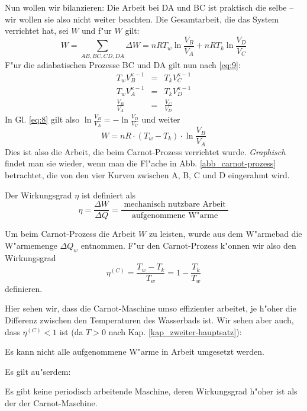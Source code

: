 \bigskip
\noindent
Nun wollen wir bilanzieren: Die Arbeit bei DA und BC ist praktisch die
selbe -- wir wollen sie also nicht weiter beachten. Die Gesamtarbeit,
die das System verrichtet hat, sei $W$ und f"ur $W$ gilt:
\begin{equation}
   \label{eq:8}
   W = \sum_{AB,BC,CD,DA} \Delta W = nRT_w \ln\frac{V_B}{V_A} + nRT_k \ln
\frac{V_D}{V_C}
\end{equation}
F"ur die adiabatischen Prozesse BC und DA gilt nun nach \eqref{eq:9}:
\begin{eqnarray}
\nonumber
   T_wV_B^{ \kappa-1 } &=& T_k V_C^{ \kappa-1 }\\
\nonumber
   T_wV_A^{ \kappa-1 } &=& T_k V_D^{ \kappa-1 }\\
\label{eq:11}
\frac{V_B}{V_A} &=& \frac{V_C}{V_D}
\end{eqnarray}
In Gl. \eqref{eq:8} gilt also $\ln\frac{V_B}{V_A} = -\ln
\frac{V_D}{V_C}$ und weiter
\begin{equation}
   \label{eq:12}
\boxed{ W =  nR\cdot(T_w - T_k)\cdot \ln \frac{V_B}{V_A} }
\end{equation}
Dies ist also die Arbeit, die beim Carnot-Prozess verrichtet
wurde. \emph{Graphisch} findet man sie wieder, wenn man die Fl"ache in
Abb. \ref{abb_carnot-prozess} betrachtet, die von den vier Kurven
zwischen A, B, C und D eingerahmt wird.






\begin{Def}
Der Wirkungsgrad $\eta$ ist definiert als
\begin{equation}
   \label{eqn_def_wirkungsgrad}
\eta = \frac{\Delta W}{ \Delta Q}    = \frac{\text{ mechanisch
    nutzbare Arbeit }}{\text{ aufgenommene W"arme }}
\end{equation}
\end{Def}

Um beim Carnot-Prozess die Arbeit $W$ zu leisten, wurde aus dem
W"armebad die W"armemenge $\Delta Q_w$ entnommen. F"ur den Carnot-Prozess
k"onnen wir also den Wirkungsgrad
\begin{equation}
   \label{eqn_carnot_wirkungsgrad}
\eta^{ (C) } = \frac{T_w - T_k}{T_w}    = 1- \frac{T_k}{T_w}
\end{equation}
definieren.

Hier sehen wir, dass die Carnot-Maschine umso effizienter arbeitet,
je h"oher die Differenz zwischen den Temperaturen des Wasserbads ist.
Wir sehen aber auch, dass $\eta^{ (C) } < 1$ ist (da $T>0$ nach Kap.
\ref{kap_zweiter-hauptsatz}):
\begin{Wichtig}
   [Wirkungsgrad]
Es kann nicht alle aufgenommene W"arme in Arbeit umgesetzt werden.
\end{Wichtig}
Es gilt au"serdem:
\begin{Wichtig}
   Es gibt keine periodisch arbeitende Maschine, deren Wirkungsgrad
   h"oher ist als der der Carnot-Maschine.
\end{Wichtig}



